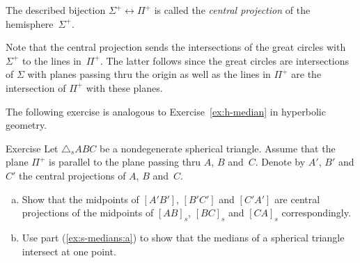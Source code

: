 The described bijection $\Sigma^+\leftrightarrow \Pi^+$ is called the \emph{central projection} of 
the hemisphere~$\Sigma^+$.

Note that the central projection sends the intersections of the great circles with $\Sigma^+$ to the lines in~$\Pi^+$.
The latter follows since the great circles are intersections of $\Sigma$ with planes passing thru the origin
as well as the lines in $\Pi^+$ are the intersection of $\Pi^+$ with these planes.

The following exercise 
is analogous to Exercise~\ref{ex:h-median}
in hyperbolic geometry.

\begin{thm}{Exercise}\label{ex:s-medians}
Let $\triangle_sABC$ be a nondegenerate spherical triangle.
Assume that the plane $\Pi^+$ is parallel to the plane passing thru $A$, $B$ and~$C$.
Denote by $A'$, $B'$ and $C'$ the central projections of $A$, $B$ and~$C$.
\begin{enumerate}[(a)]
\item\label{ex:s-medians:a} Show that the midpoints of $[A'B']$, $[B'C']$ and $[C'A']$
are central projections of the midpoints of $[AB]_s$, $[BC]_s$ and $[CA]_s$ correspondingly.
\item\label{ex:s-medians:b} Use part (\ref{ex:s-medians:a}) to show that the medians of a spherical triangle intersect at one point.
\end{enumerate}

\end{thm}





